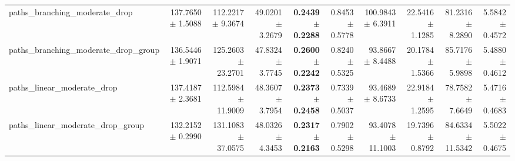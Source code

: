 \begin{tabular}{@{}lrrrrrrrrr@{}}
paths\_branching\_moderate\_drop & 137.7650 $\pm$ 1.5088 & 112.2217 $\pm$ 9.3674 & 49.0201 $\pm$ 3.2679 & \textbf{0.2439 $\pm$ 0.2288} & 0.8453 $\pm$ 0.5778 & 100.9843 $\pm$ 6.3911 & 22.5416 $\pm$ 1.1285 & 81.2316 $\pm$ 8.2890 & 5.5842 $\pm$ 0.4572 \\
paths\_branching\_moderate\_drop\_group & 136.5446 $\pm$ 1.9071 & 125.2603 $\pm$ 23.2701 & 47.8324 $\pm$ 3.7745 & \textbf{0.2600 $\pm$ 0.2242} & 0.8240 $\pm$ 0.5325 & 93.8667 $\pm$ 8.4488 & 20.1784 $\pm$ 1.5366 & 85.7176 $\pm$ 5.9898 & 5.4880 $\pm$ 0.4612 \\
paths\_linear\_moderate\_drop & 137.4187 $\pm$ 2.3681 & 112.5984 $\pm$ 11.9009 & 48.3607 $\pm$ 3.7954 & \textbf{0.2373 $\pm$ 0.2458} & 0.7339 $\pm$ 0.5037 & 93.4689 $\pm$ 8.6733 & 22.9184 $\pm$ 1.2595 & 78.7582 $\pm$ 7.6649 & 5.4716 $\pm$ 0.4683 \\
paths\_linear\_moderate\_drop\_group & 132.2152 $\pm$ 0.2990 & 131.1083 $\pm$ 37.0575 & 48.0326 $\pm$ 4.3453 & \textbf{0.2317 $\pm$ 0.2163} & 0.7902 $\pm$ 0.5298 & 93.4078 $\pm$ 11.1003 & 19.7396 $\pm$ 0.8792 & 84.6334 $\pm$ 11.5342 & 5.5022 $\pm$ 0.4675 \\
\bottomrule
\end{tabular}
